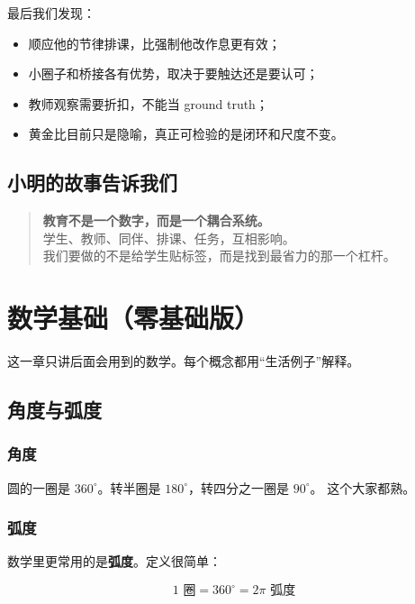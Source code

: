 \documentclass[UTF8,a4paper,11pt]{ctexart}
\newcommand{\term}[1]{\textbf{#1}}
\begin{document}
最后我们发现：

\begin{itemize}[leftmargin=2em]
\item 顺应他的节律排课，比强制他改作息更有效；
\item 小圈子和桥接各有优势，取决于要触达还是要认可；
\item 教师观察需要折扣，不能当 ground truth；
\item 黄金比目前只是隐喻，真正可检验的是闭环和尺度不变。
\end{itemize}

\subsection{小明的故事告诉我们}

\begin{quote}
\textbf{教育不是一个数字，而是一个耦合系统。}\\
学生、教师、同伴、排课、任务，互相影响。\\
我们要做的不是给学生贴标签，而是找到最省力的那一个杠杆。
\end{quote}



\section{数学基础（零基础版）}

这一章只讲后面会用到的数学。每个概念都用“生活例子”解释。

\subsection{角度与弧度}

\subsubsection{角度}

圆的一圈是 $360^\circ$。转半圈是 $180^\circ$，转四分之一圈是 $90^\circ$。
这个大家都熟。

\subsubsection{弧度}

数学里更常用的是\term{弧度}。定义很简单：

\begin{equation}
1 \text{ 圈} = 360^\circ = 2\pi \text{ 弧度}
\end{equation}
\end{document}
